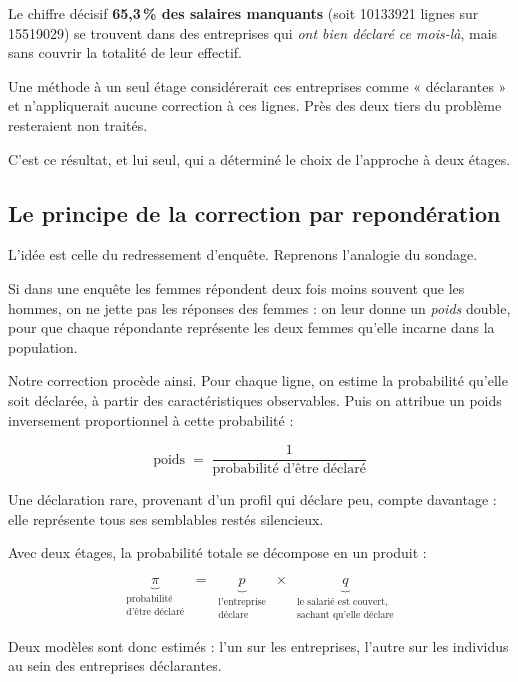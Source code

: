 \documentclass[11pt,a4paper]{article}
\begin{document}
\begin{alerte}{Le chiffre décisif}
\textbf{65,3\,\% des salaires manquants} (soit \num{10133921} lignes sur
\num{15519029}) se trouvent dans des entreprises qui \emph{ont bien
déclaré ce mois-là}, mais sans couvrir la totalité de leur effectif.

Une méthode à un seul étage considérerait ces entreprises comme
« déclarantes » et n'appliquerait aucune correction à ces lignes. Près des
deux tiers du problème resteraient non traités.
\end{alerte}

C'est ce résultat, et lui seul, qui a déterminé le choix de l'approche à
deux étages.

\subsection{Le principe de la correction par repondération}

L'idée est celle du redressement d'enquête. Reprenons l'analogie du
sondage.

Si dans une enquête les femmes répondent deux fois moins souvent que les
hommes, on ne jette pas les réponses des femmes : on leur donne un
\emph{poids} double, pour que chaque répondante représente les deux
femmes qu'elle incarne dans la population.

Notre correction procède ainsi. Pour chaque ligne, on estime la
probabilité qu'elle soit déclarée, à partir des caractéristiques
observables. Puis on attribue un poids inversement proportionnel à cette
probabilité :

\[
\text{poids} \;=\; \frac{1}{\text{probabilité d'être déclaré}}
\]

Une déclaration rare, provenant d'un profil qui déclare peu, compte
davantage : elle représente tous ses semblables restés silencieux.

Avec deux étages, la probabilité totale se décompose en un produit :

\[
\underbrace{\pi}_{\substack{\text{probabilité}\\\text{d'être déclaré}}}
\;=\;
\underbrace{p}_{\substack{\text{l'entreprise}\\\text{déclare}}}
\;\times\;
\underbrace{q}_{\substack{\text{le salarié est couvert,}\\\text{sachant qu'elle déclare}}}
\]

Deux modèles sont donc estimés : l'un sur les entreprises, l'autre sur les
individus au sein des entreprises déclarantes.
\end{document}
